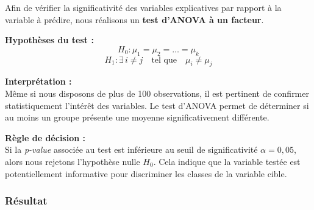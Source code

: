 \documentclass[a4paper,11pt]{article}
\begin{document}
\begin{tcolorbox}[colback=gray!10, colframe=black, title=Test d'ANOVA à un facteur, fonttitle=\bfseries]
Afin de vérifier la significativité des variables explicatives par rapport à la variable à prédire, nous réalisons un \textbf{test d'ANOVA à un facteur}.

\bigskip

\textbf{Hypothèses du test :}
\begin{equation}
H_0 : \mu_1 = \mu_2 = \dots = \mu_k
\end{equation}
\begin{equation}
H_1 : \exists\, i \neq j \quad \text{tel que} \quad \mu_i \neq \mu_j
\end{equation}

\bigskip

\textbf{Interprétation :} \\
Même si nous disposons de plus de 100 observations, il est pertinent de confirmer statistiquement l’intérêt des variables. Le test d’ANOVA permet de déterminer si au moins un groupe présente une moyenne significativement différente.

\bigskip

\textbf{Règle de décision :} \\
Si la \textit{p-value} associée au test est inférieure au seuil de significativité \(\alpha = 0{,}05\), alors nous rejetons l’hypothèse nulle \(H_0\). Cela indique que la variable testée est potentiellement informative pour discriminer les classes de la variable cible.
\end{tcolorbox}

\subsubsection{Résultat}
\end{document}
